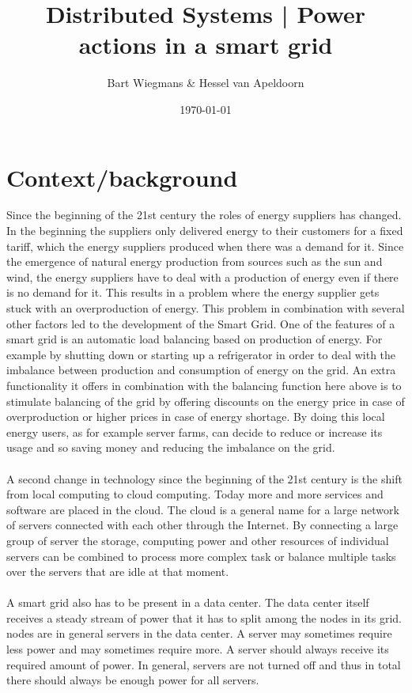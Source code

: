 \documentclass[10pt]{article} %
\title{\textsf{Distributed Systems | Power actions in a smart grid}}
\author{Bart Wiegmans \& Hessel van Apeldoorn}
\date{\today}
\begin{document}
\maketitle
\newpage
\section{Context/background}
Since the beginning of the 21st century the roles of energy suppliers has changed.  In the beginning the suppliers only delivered energy to their customers for a fixed tariff, which the energy suppliers produced when there was a demand for it. Since the emergence of natural energy production from sources such as the sun and wind, the energy suppliers have to deal with a production of energy even if there is no demand for it.  This results in a problem where the energy supplier gets stuck with an overproduction of energy.  This problem in combination with several other factors led to the development of the Smart Grid.
One of the features of a smart grid is an automatic load balancing based on production of energy. For example by shutting down or starting up a refrigerator in order to deal with the imbalance between production and consumption of energy on the grid.
An extra functionality it offers in combination with the balancing function here above is to stimulate balancing of the grid by offering discounts on the energy price in case of overproduction or higher prices in case of energy shortage. By doing this local energy users, as for example server farms, can decide to reduce or increase its usage and so saving money and reducing the imbalance on the grid.\\
 \\
A second change in technology since the beginning of the 21st century is the shift from local computing to cloud computing.  Today more and more services and software are placed in the cloud. The cloud is a general name for a large network of servers connected with each other through the Internet. By connecting a large group of server the storage, computing power and other resources of individual servers can be combined to process more complex task or balance multiple tasks over the servers that are idle at that moment.\\
\\
A smart grid also has to be present in a data center. The data center itself receives a steady stream of power that it has to split among the nodes in its grid. nodes are in general servers in the data center. A server may sometimes require less power and may sometimes require more. A server should always receive its required amount of power. In general, servers are not turned off and thus in total there should always be enough power for all servers.
\end{document}
